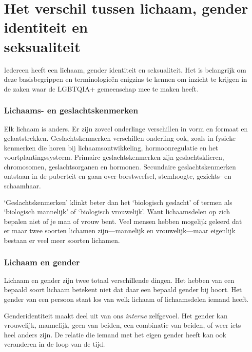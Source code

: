 \documentclass[12pt,openany]{book}
\begin{document}
\section*{Het verschil tussen lichaam, gender identiteit en \\ \mbox{seksualiteit}}

Iedereen heeft een lichaam, gender identiteit en seksualiteit. Het is belangrijk om deze basisbegrippen en terminologieën enigzins te kennen om inzicht te krijgen in de zaken waar de LGBTQIA+ gemeenschap mee te maken heeft.

\subsubsection*{Lichaams- en geslachtskenmerken}

Elk lichaam is anders. Er zijn zoveel onderlinge verschillen in vorm en formaat en gelaatstrekken. Geslachtskenmerken verschillen onderling ook, zoals in fysieke kenmerken die horen bij lichaamsontwikkeling, hormoonregulatie en het voortplantingssysteem. Primaire geslachtskenmerken zijn geslachtsklieren, chromosomen, geslachtsorganen en hormonen. Secundaire geslachtskenmerken ontstaan in de puberteit en gaan over borstweefsel, stemhoogte, gezichts- en schaamhaar.

‘Geslachtskenmerken’ klinkt beter dan het ‘biologisch geslacht’ of termen als ‘biologisch mannelijk’ of ‘biologisch vrouwelijk’. Want lichaamsdelen op zich bepalen niet of je man of vrouw bent. Veel mensen hebben mogelijk geleerd dat er maar twee soorten lichamen zijn—mannelijk en vrouwelijk—maar eigenlijk bestaan er veel meer soorten lichamen.

\subsubsection*{Lichaam en gender}

Lichaam en gender zijn twee totaal verschillende dingen. Het hebben van een bepaald soort lichaam betekent niet dat daar een bepaald gender bij hoort. Het gender van een persoon staat los van welk lichaam of lichaamsdelen iemand heeft.

Genderidentiteit maakt deel uit van ons \textit{interne} zelfgevoel. Het gender kan vrouwelijk, mannelijk, geen van beiden, een combinatie van beiden, of weer iets heel anders zijn. De relatie die iemand met het eigen gender heeft kan ook veranderen in de loop van de tijd.
\end{document}
